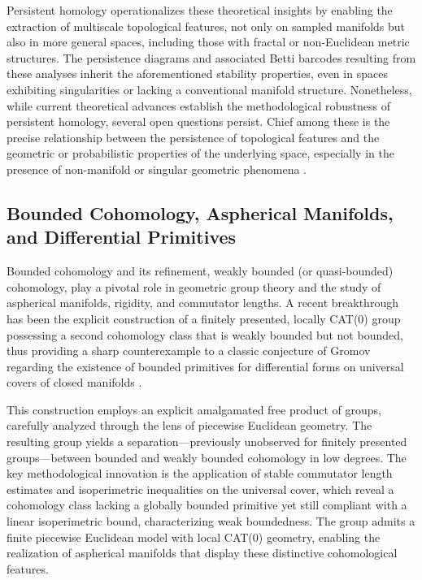 \documentclass[sigconf]{acmart}
\begin{document}
Persistent homology operationalizes these theoretical insights by enabling the extraction of multiscale topological features, not only on sampled manifolds but also in more general spaces, including those with fractal or non-Euclidean metric structures. The persistence diagrams and associated Betti barcodes resulting from these analyses inherit the aforementioned stability properties, even in spaces exhibiting singularities or lacking a conventional manifold structure. Nonetheless, while current theoretical advances establish the methodological robustness of persistent homology, several open questions persist. Chief among these is the precise relationship between the persistence of topological features and the geometric or probabilistic properties of the underlying space, especially in the presence of non-manifold or singular geometric phenomena \cite{ref88}.

\subsection{Bounded Cohomology, Aspherical Manifolds, and Differential Primitives}

Bounded cohomology and its refinement, weakly bounded (or quasi-bounded) cohomology, play a pivotal role in geometric group theory and the study of aspherical manifolds, rigidity, and commutator lengths. A recent breakthrough has been the explicit construction of a finitely presented, locally CAT(0) group possessing a second cohomology class that is weakly bounded but not bounded, thus providing a sharp counterexample to a classic conjecture of Gromov regarding the existence of bounded primitives for differential forms on universal covers of closed manifolds \cite{ref84}.

This construction employs an explicit amalgamated free product of groups, carefully analyzed through the lens of piecewise Euclidean geometry. The resulting group yields a separation—previously unobserved for finitely presented groups—between bounded and weakly bounded cohomology in low degrees. The key methodological innovation is the application of stable commutator length estimates and isoperimetric inequalities on the universal cover, which reveal a cohomology class lacking a globally bounded primitive yet still compliant with a linear isoperimetric bound, characterizing weak boundedness. The group admits a finite piecewise Euclidean model with local CAT(0) geometry, enabling the realization of aspherical manifolds that display these distinctive cohomological features.
\end{document}
